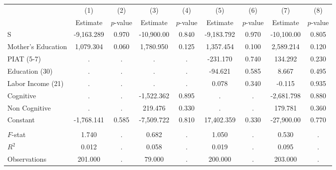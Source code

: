 \begin{tabular}{lcccccccc} \toprule
 & (1) & (2) & (3) & (4) & (5) & (6) & (7) & (8) \\ 
 & Estimate  & $p$-value  & Estimate  & $p$-value  & Estimate  & $p$-value  & Estimate  & $p$-value  \\  \midrule
S & -9,163.289 &     0.970 & -10,900.00 &     0.840 & -9,183.792 &     0.970 & -10,100.00 &     0.805 \\  
Mother's Education &  1,079.304 &     0.060 &  1,780.950 &     0.125 &  1,357.454 &     0.100 &  2,589.214 &     0.120 \\  
PIAT (5-7) &         . &         . &         . &         . &  -231.170 &     0.740 &   134.292 &     0.230 \\  
Education (30) &         . &         . &         . &         . &   -94.621 &     0.585 &     8.667 &     0.495 \\  
Labor Income (21) &         . &         . &         . &         . &     0.078 &     0.340 &    -0.115 &     0.935 \\  
Cognitive &         . &         . & -1,522.362 &     0.895 &         . &         . & -2,681.798 &     0.880 \\  
Non Cognitive &         . &         . &   219.476 &     0.330 &         . &         . &   179.781 &     0.360 \\  
Constant & -1,768.141 &     0.585 & -7,509.722 &     0.810 & 17,402.359 &     0.330 & -27,900.00 &     0.770 \\  \\ \midrule
$F$-stat &     1.740 &         . &     0.682 &         . &     1.050 &         . &     0.530 &         . \\  
$R^2$ &     0.012 &         . &     0.058 &         . &     0.019 &         . &     0.095 &         . \\  
Observations &   201.000 &         . &    79.000 &         . &   200.000 &         . &   203.000 &         . \\  
\bottomrule  \end{tabular}
